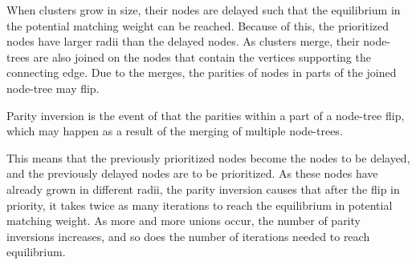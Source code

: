 When clusters grow in size, their nodes are delayed such that the equilibrium in the potential matching weight can be reached. Because of this, the prioritized nodes have larger radii than the delayed nodes. As clusters merge, their node-trees are also joined on the nodes that contain the vertices supporting the connecting edge. Due to the merges, the parities of nodes in parts of the joined node-tree may flip. 
\begin{definition}\label{def:parityinversion}
  Parity inversion is the event of that the parities within a part of a node-tree flip, which may happen as a result of the merging of multiple node-trees. 
\end{definition}
This means that the previously prioritized nodes become the nodes to be delayed, and the previously delayed nodes are to be prioritized. As these nodes have already grown in different radii, the parity inversion causes that after the flip in priority, it takes twice as many iterations to reach the equilibrium in potential matching weight. As more and more unions occur, the number of parity inversions increases, and so does the number of iterations needed to reach equilibrium. 

